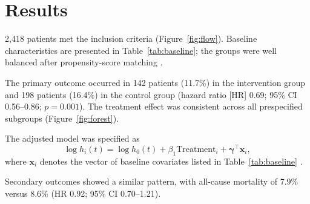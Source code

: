 \section{Results}
\label{sec:results}

2,418 patients met the inclusion criteria (Figure~\ref{fig:flow}). Baseline characteristics are presented in Table~\ref{tab:baseline}; the groups were well balanced after propensity-score matching \cite{austin2011introduction}.

The primary outcome occurred in 142 patients (11.7\%) in the intervention group and 198 patients (16.4\%) in the control group (hazard ratio [HR] 0.69; 95\% CI 0.56--0.86; $p = 0.001$). The treatment effect was consistent across all prespecified subgroups (Figure~\ref{fig:forest}).

The adjusted model was specified as
\begin{equation}
  \log h_i(t) = \log h_0(t) + \beta_1 \text{Treatment}_i + \boldsymbol{\gamma}^\top \mathbf{x}_i ,
  \label{eq:cox}
\end{equation}
where $\mathbf{x}_i$ denotes the vector of baseline covariates listed in Table~\ref{tab:baseline} \cite{cox1972regression, therneau2000modeling}.

Secondary outcomes showed a similar pattern, with all-cause mortality of 7.9\% versus 8.6\% (HR 0.92; 95\% CI 0.70--1.21).
